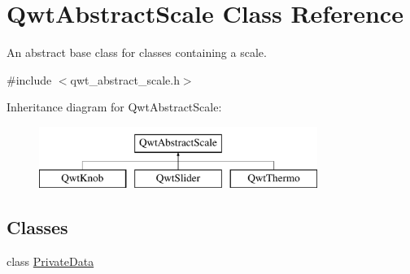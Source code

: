 \hypertarget{class_qwt_abstract_scale}{\section{Qwt\-Abstract\-Scale Class Reference}
\label{class_qwt_abstract_scale}
}


An abstract base class for classes containing a scale.  




{\ttfamily \#include $<$qwt\-\_\-abstract\-\_\-scale.\-h$>$}

Inheritance diagram for Qwt\-Abstract\-Scale\-:\begin{figure}[H]
\begin{center}
\leavevmode
\includegraphics[height=2.000000cm]{class_qwt_abstract_scale}
\end{center}
\end{figure}
\subsection*{Classes}
\begin{DoxyCompactItemize}
\item 
class \hyperlink{class_qwt_abstract_scale_1_1_private_data}{Private\-Data}
\end{DoxyCompactItemize}
